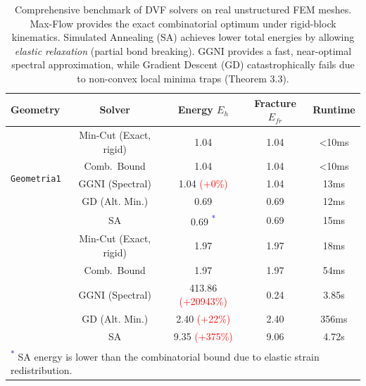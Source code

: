 \begin{table}[htbp]
\centering
\caption{Comprehensive benchmark of DVF solvers on real unstructured FEM meshes. 
Max-Flow provides the exact combinatorial optimum under rigid-block kinematics. 
Simulated Annealing (SA) achieves lower total energies by allowing \textit{elastic relaxation} (partial bond breaking). 
GGNI provides a fast, near-optimal spectral approximation, while Gradient Descent (GD) catastrophically fails due to non-convex local minima traps (Theorem 3.3).}
\label{tab:comprehensive_benchmark}
\small
\begin{tabular}{l c c c c}
\toprule
\textbf{Geometry} & \textbf{Solver} & \textbf{Energy $E_h$} & \textbf{Fracture $E_{fr}$} & \textbf{Runtime} \\
\midrule
\multirow{5}{*}{\texttt{Geometria1}} & Min-Cut (Exact, rigid) & 1.04 & 1.04 & <10ms \\
 & Comb.\ Bound & 1.04 & 1.04 & <10ms \\
 & GGNI (Spectral) & 1.04 \textcolor{red}{(+0\%)} & 1.04 & 13ms \\
 & GD (Alt. Min.) & 0.69 & 0.69 & 12ms \\
 & SA & 0.69 \textcolor{blue}{\textsuperscript{*}} & 0.69 & 15ms \\
\addlinespace
\multirow{5}{*}{\texttt{Geometria\_Transfinita}} & Min-Cut (Exact, rigid) & 1.97 & 1.97 & 18ms \\
 & Comb.\ Bound & 1.97 & 1.97 & 54ms \\
 & GGNI (Spectral) & 413.86 \textcolor{red}{(+20943\%)} & 0.24 & 3.85s \\
 & GD (Alt. Min.) & 2.40 \textcolor{red}{(+22\%)} & 2.40 & 356ms \\
 & SA & 9.35 \textcolor{red}{(+375\%)} & 9.06 & 4.72s \\
\bottomrule
\multicolumn{5}{l}{\footnotesize \textcolor{blue}{\textsuperscript{*}} SA energy is lower than the combinatorial bound due to elastic strain redistribution.}
\end{tabular}
\end{table}